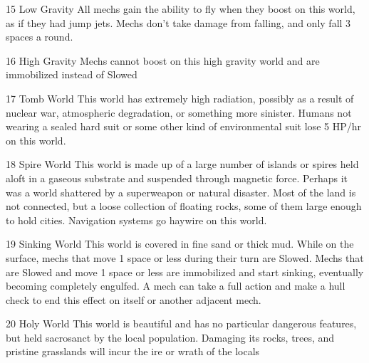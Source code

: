 15      Low Gravity                        All mechs gain the ability to fly when they boost on this
                                            world, as if they had jump jets. Mechs don’t take
                                            damage from falling, and only fall 3 spaces a round.




 16      High Gravity                        Mechs cannot boost on this high gravity world and are
                                             immobilized instead of Slowed

 17      Tomb World                          This world has extremely high radiation, possibly as a
                                             result of nuclear war, atmospheric degradation, or
                                             something more sinister. Humans not wearing a sealed
                                             hard suit or some other kind of environmental suit lose
                                             5 HP/hr on this world.

 18      Spire World                         This world is made up of a large number of islands or
                                             spires held aloft in a gaseous substrate and suspended
                                             through magnetic force. Perhaps it was a world
                                             shattered by a superweapon or natural disaster. Most of
                                             the land is not connected, but a loose collection of
                                             floating rocks, some of them large enough to hold
                                             cities. Navigation systems go haywire on this world.

 19      Sinking World                       This world is covered in fine sand or thick mud. While
                                             on the surface, mechs that move 1 space or less during
                                             their turn are Slowed. Mechs that are Slowed and move
                                             1 space or less are immobilized and start sinking,
                                             eventually becoming completely engulfed. A mech can
                                             take a full action and make a hull check to end this
                                             effect on itself or another adjacent mech.

 20      Holy World                          This world is beautiful and has no particular dangerous
                                             features, but held sacrosanct by the local population.
                                             Damaging its rocks, trees, and pristine grasslands will
                                             incur the ire or wrath of the locals

